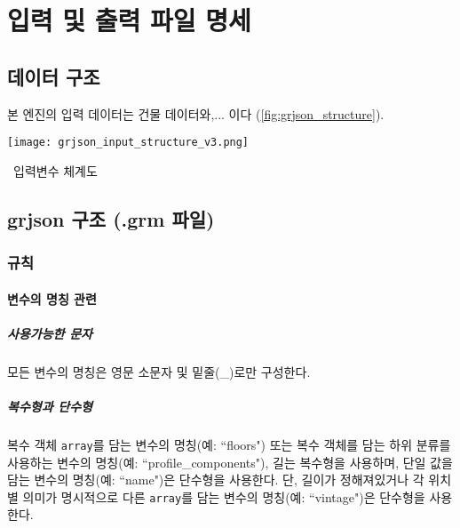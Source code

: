 \chapter{입력 및 출력 파일 명세}

\section{ 데이터 구조}
본 엔진의 입력 데이터는 건물 데이터와,... 이다 (\ref{fig:grjson_structure}).

\begin{defaultfigure}
  \texttt{[image: grjson\_input\_structure\_v3.png]}
  \caption{\simulator\ 입력변수 체계도}
  \label{fig:grjson_structure}
\end{defaultfigure}


\section{grjson 구조 (.grm 파일)}

\subsection{규칙}

\subsubsection{변수의 명칭 관련}

\paragraph{사용가능한 문자} 모든 변수의 명칭은 영문 소문자 및 밑줄(\_)로만 구성한다.

\paragraph{복수형과 단수형} 복수 객체 \texttt{array}를 담는 변수의 명칭(예: ``floors") 또는 복수 객체를 담는 하위 분류를 사용하는 변수의 명칭(예: ``profile\_components"), 길는 복수형을 사용하며, 단일 값을 담는 변수의 명칭(예: ``name")은 단수형을 사용한다. 단, 길이가 정해져있거나 각 위치별 의미가 명시적으로 다른 \texttt{array}를 담는 변수의 명칭(예: ``vintage")은 단수형을 사용한다.

